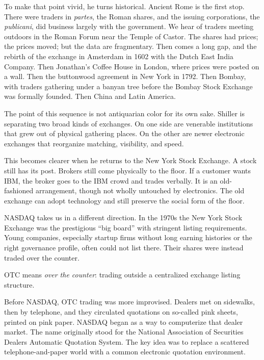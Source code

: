 To make that point vivid, he turns historical. Ancient Rome is the first stop. There were traders in \emph{partes}, the Roman shares, and the issuing corporations, the \emph{publicani}, did business largely with the government. We hear of traders meeting outdoors in the Roman Forum near the Temple of Castor. The shares had prices; the prices moved; but the data are fragmentary. Then comes a long gap, and the rebirth of the exchange in Amsterdam in 1602 with the Dutch East India Company. Then Jonathan's Coffee House in London, where prices were posted on a wall. Then the buttonwood agreement in New York in 1792. Then Bombay, with traders gathering under a banyan tree before the Bombay Stock Exchange was formally founded. Then China and Latin America.

The point of this sequence is not antiquarian color for its own sake. Shiller is separating two broad kinds of exchanges. On one side are venerable institutions that grew out of physical gathering places. On the other are newer electronic exchanges that reorganize matching, visibility, and speed.

This becomes clearer when he returns to the New York Stock Exchange. A stock still has its post. Brokers still come physically to the floor. If a customer wants IBM, the broker goes to the IBM crowd and trades verbally. It is an old-fashioned arrangement, though not wholly untouched by electronics. The old exchange can adopt technology and still preserve the social form of the floor.

NASDAQ takes us in a different direction. In the 1970s the New York Stock Exchange was the prestigious ``big board'' with stringent listing requirements. Young companies, especially startup firms without long earning histories or the right governance profile, often could not list there. Their shares were instead traded over the counter.

\begin{remark}
OTC means \emph{over the counter}: trading outside a centralized exchange listing structure.
\end{remark}

Before NASDAQ, OTC trading was more improvised. Dealers met on sidewalks, then by telephone, and they circulated quotations on so-called pink sheets, printed on pink paper. NASDAQ began as a way to computerize that dealer market. The name originally stood for the National Association of Securities Dealers Automatic Quotation System. The key idea was to replace a scattered telephone-and-paper world with a common electronic quotation environment.

